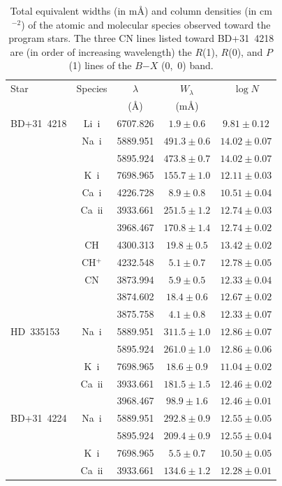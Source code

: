 \documentclass[fleqn,usenatbib]{mnras}
\begin{document}
\begin{table}
\centering
\caption{Total equivalent widths (in m\AA{}) and column densities (in cm$^{-2}$) of the atomic and molecular species observed toward the program stars. The three CN lines listed toward BD+31~4218 are (in order of increasing wavelength) the $R$(1), $R$(0), and $P$(1) lines of the $B$$-$$X$ (0,~0) band.}
\label{tab:totals}
\begin{tabular}{lcccc}
\hline
Star & Species & $\lambda$ & $W_{\lambda}$ & $\log N$ \\
 & & (\AA{}) & (m\AA{}) & \\
\hline
BD+31~4218 & Li~{\sc i} & 6707.826 & $1.9\pm0.6$ & $9.81\pm0.12$ \\
 & Na~{\sc i} & 5889.951 & $491.3\pm0.6$ & $14.02\pm0.07$ \\
 & & 5895.924 & $473.8\pm0.7$ & $14.02\pm0.07$ \\
 & K~{\sc i} & 7698.965 & $155.7\pm1.0$ & $12.11\pm0.03$ \\
 & Ca~{\sc i} & 4226.728 & $8.9\pm0.8$ & $10.51\pm0.04$ \\
 & Ca~{\sc ii} & 3933.661 & $251.5\pm1.2$ & $12.74\pm0.03$ \\
 & & 3968.467 & $170.8\pm1.4$ & $12.74\pm0.02$ \\
 & CH & 4300.313 & $19.8\pm0.5$ & $13.42\pm0.02$ \\
 & CH$^+$ & 4232.548 & $5.1\pm0.7$ & $12.78\pm0.05$ \\
 & CN & 3873.994 & $5.9\pm0.5$ & $12.33\pm0.04$ \\
 & & 3874.602 & $18.4\pm0.6$ & $12.67\pm0.02$ \\
 & & 3875.758 & $4.1\pm0.8$ & $12.33\pm0.07$ \\
HD~335153 & Na~{\sc i} & 5889.951 & $311.5\pm1.0$ & $12.86\pm0.07$ \\
 & & 5895.924 & $261.0\pm1.0$ & $12.86\pm0.06$ \\
 & K~{\sc i} & 7698.965 & $18.6\pm0.9$ & $11.04\pm0.02$ \\
 & Ca~{\sc ii} & 3933.661 & $181.5\pm1.5$ & $12.46\pm0.02$ \\
 & & 3968.467 & $98.9\pm1.6$ & $12.46\pm0.01$ \\
BD+31~4224 & Na~{\sc i} & 5889.951 & $292.8\pm0.9$ & $12.55\pm0.05$ \\
 & & 5895.924 & $209.4\pm0.9$ & $12.55\pm0.04$ \\
 & K~{\sc i} & 7698.965 & $5.5\pm0.7$ & $10.50\pm0.05$ \\
 & Ca~{\sc ii} & 3933.661 & $134.6\pm1.2$ & $12.28\pm0.01$ \\

\end{tabular}
\end{table}
\end{document}
